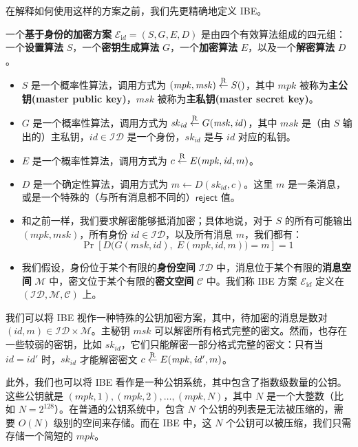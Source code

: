 在解释如何使用这样的方案之前，我们先更精确地定义 IBE。

\begin{definition}\label{def:15-7}
一个\textbf{基于身份的加密方案} $\mathcal{E}_{\mathrm{i}d}=(S,G,E,D)$ 是由四个有效算法组成的四元组：一个\textbf{设置算法} $S$，一个\textbf{密钥生成算法} $G$，一个\textbf{加密算法} $E$，以及一个\textbf{解密算法} $D$。
\begin{itemize}
	\item $S$ 是一个概率性算法，调用方式为 $(\mathit{mpk},\mathit{msk})\overset{\rm R}\leftarrow S()$，其中 $\mathit{mpk}$ 被称为\textbf{主公钥(master public key)}，$\mathit{msk}$ 被称为\textbf{主私钥(master secret key)}。
	\item $G$ 是一个概率性算法，调用方式为 $\mathit{sk}_\mathit{id}\overset{\rm R}\leftarrow G(\mathit{msk},\mathit{id})$，其中 $\mathit{msk}$ 是（由 $S$ 输出的）主私钥，$\mathit{id}\in\mathcal{ID}$ 是一个身份，$\mathit{sk}_\mathit{id}$ 是与 $\mathit{id}$ 对应的私钥。
	\item $E$ 是一个概率性算法，调用方式为 $c\overset{\rm R}\leftarrow E(\mathit{mpk},\mathit{id},m)$。
	\item $D$ 是一个确定性算法，调用方式为 $m\leftarrow D(\mathit{sk}_\mathit{id},c)$。这里 $m$ 是一条消息，或是一个特殊的（与所有消息都不同的）$\mathsf{reject}$ 值。
	\item 和之前一样，我们要求解密能够抵消加密；具体地说，对于 $S$ 的所有可能输出 $(\mathit{mpk},\mathit{msk})$，所有身份 $\mathit{id}\in\mathcal{ID}$，以及所有消息 $m$，我们都有：
	\[
	\Pr\left[D\big(G(\mathit{msk},\mathit{id}),\;E(\mathit{mpk},\mathit{id},m)\big)=m\right]=1
	\]
	\item 我们假设，身份位于某个有限的\textbf{身份空间} $\mathcal{ID}$ 中，消息位于某个有限的\textbf{消息空间} $\mathcal{M}$ 中，密文位于某个有限的\textbf{密文空间} $\mathcal{C}$ 中。我们称 IBE 方案 $\mathcal{E}_{\mathrm{i}d}$ 定义在 $(\mathcal{ID},\mathcal{M},\mathcal{C})$ 上。
\end{itemize}
\end{definition}

我们可以将 IBE 视作一种特殊的公钥加密方案，其中，待加密的消息是数对 $(\mathit{id},m)\in\mathcal{ID}\times\mathcal{M}$。主秘钥 $\mathit{msk}$ 可以解密所有格式完整的密文。然而，也存在一些较弱的密钥，比如 $\mathit{sk}_\mathit{id}$，它们只能解密一部分格式完整的密文：只有当 $\mathit{id}=\mathit{id'}$ 时，$\mathit{sk}_\mathit{id}$ 才能解密密文 $c\overset{\rm R}\leftarrow E(\mathit{mpk},\mathit{id'},m)$。

此外，我们也可以将 IBE 看作是一种公钥系统，其中包含了指数级数量的公钥。这些公钥就是 $(\mathit{mpk},1), (\mathit{mpk},2),\dots,(\mathit{mpk},N)$，其中 $N$ 是一个大整数（比如 $N=2^{128}$）。在普通的公钥系统中，包含 $N$ 个公钥的列表是无法被压缩的，需要 $O(N)$ 级别的空间来存储。而在 IBE 中，这 $N$ 个公钥可以被压缩，我们只需存储一个简短的 $\mathit{mpk}$。

